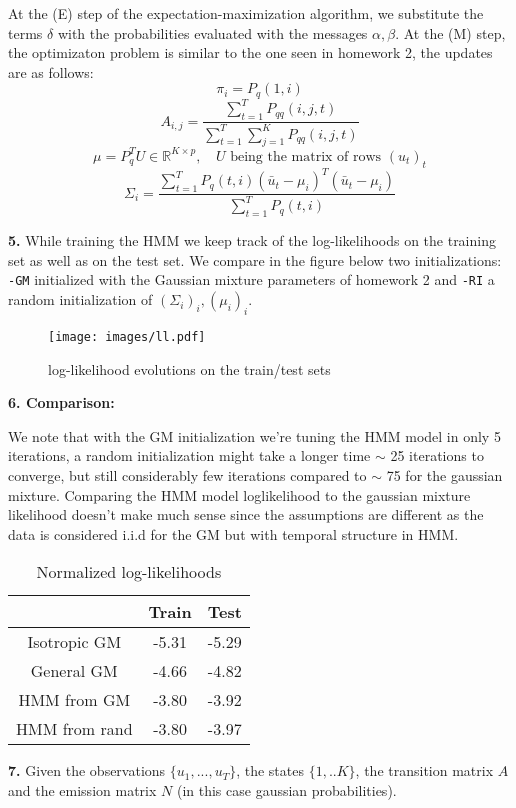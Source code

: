 \documentclass[11pt]{article}
\newcommand{\R}{\mathbb{R}}
\newcommand{\1}{\mathbbm{1}}
\newcommand{\0}{\mathbf{0}}
\begin{document}
At the (E) step of the expectation-maximization algorithm, we substitute the terms $\delta$ with the probabilities evaluated with the messages $\alpha,\beta$. At the (M) step, the optimizaton problem is similar to the one seen in homework 2, the updates are as follows:
\[\pi_i=P_q(1,i)\]
\[A_{i,j}=\frac{\sum_{t=1}^T P_{qq}(i,j,t)}{\sum_{t=1}^T\sum_{j=1}^K P_{qq}(i,j,t)}\]
\[\mu=P_q^TU\in\R^{K\times p},\phantom{ab}U\text{ being the matrix of rows }(u_t)_t\]
\[\Sigma_i=\frac{\sum_{t=1}^TP_q(t,i)(\bar u_t-\mu_i)^T(\bar u_t-\mu_i)}{\sum_{t=1}^TP_q(t,i)}\]

\textbf{5.} While training the HMM we keep track of the log-likelihoods on the training set as well as on the test set. We compare in the figure below two initializations: \texttt{-GM} initialized with the Gaussian mixture parameters of homework 2 and \texttt{-RI} a random initialization of $(\Sigma_i)_i, (\mu_i)_i$.
\begin{figure}[H]
    \centering
    \texttt{[image: images/ll.pdf]}
    \caption{log-likelihood evolutions on the train/test sets}
\end{figure}

\textbf{6. Comparison:}

We note that with the GM initialization we're tuning the HMM model in only 5 iterations, a random initialization might take a longer time $\sim$ 25 iterations to converge, but still considerably few iterations compared to $\sim$ 75 for the gaussian mixture. Comparing the HMM model loglikelihood to the gaussian mixture likelihood doesn't make much sense since the assumptions are different as the data is considered i.i.d for the GM but with temporal structure in HMM.
\begin{table}[H]
\centering
\begin{tabular}{|cc||c|}
\hline
&Train&Test\\
\hline
\hline
Isotropic GM& -5.31& -5.29\\
General GM& -4.66& -4.82\\
HMM from GM& -3.80& -3.92\\
HMM from rand& -3.80& -3.97\\
\hline
\end{tabular}
\caption{Normalized log-likelihoods}
\end{table}

\textbf{7.} Given the observations $\{u_1,...,u_T\}$, the states $\{1,..K\}$, the transition matrix $A$ and the emission matrix $N$ (in this case gaussian probabilities).
\end{document}
